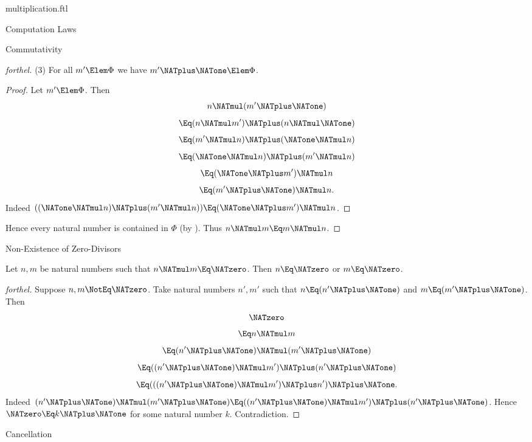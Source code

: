\documentclass{stex}
\begin{document}
\begin{smodule}{multiplication.ftl}
\begin{sfragment}{Computation Laws}
\begin{sfragment}{Commutativity}
\begin{proof}[forthel]
      (3) For all $m' \Elem \Phi$ we have $m' \NATplus \NATone \Elem \Phi$.
      \begin{proof}
        Let $m' \Elem \Phi$.
        Then
        \[  n \NATmul (m' \NATplus \NATone)                \]
        \[    \Eq (n \NATmul m') \NATplus (n \NATmul \NATone)  \]
        \[    \Eq (m' \NATmul n) \NATplus (\NATone \NATmul n)  \]
        \[    \Eq (\NATone \NATmul n) \NATplus (m' \NATmul n)  \]
        \[    \Eq (\NATone \NATplus m') \NATmul n            \]
        \[    \Eq (m' \NATplus \NATone) \NATmul n.           \]
        Indeed $((\NATone \NATmul n) \NATplus (m' \NATmul n)) \Eq (\NATone \NATplus m') \NATmul n$. %
      \end{proof}

      Hence every natural number is contained in $\Phi$ (by ).
      Thus $n \NATmul m \Eq m \NATmul n$.
    \end{proof}
  \end{sfragment}

  \begin{sfragment}{Non-Existence of Zero-Divisors}
    \begin{proposition}[forthel]
      Let $n, m$ be natural numbers such that $n \NATmul m \Eq \NATzero$.
      Then $n \Eq \NATzero$ or $m \Eq \NATzero$.
    \end{proposition}
    \begin{proof}[forthel]
      Suppose $n, m \NotEq \NATzero$.
      Take natural numbers $n', m'$ such that $n \Eq (n' \NATplus \NATone)$ and $m \Eq (m' \NATplus \NATone)$.
      Then
      \[  \NATzero                                     \]
      \[    \Eq n \NATmul m                         \]
      \[    \Eq (n' \NATplus \NATone) \NATmul (m' \NATplus \NATone)           \]
      \[    \Eq ((n' \NATplus \NATone) \NATmul m') \NATplus (n' \NATplus \NATone)    \]
      \[    \Eq (((n' \NATplus \NATone) \NATmul m') \NATplus n') \NATplus \NATone.   \]
      Indeed $(n' \NATplus \NATone) \NATmul (m' \NATplus \NATone) \Eq ((n' \NATplus \NATone) \NATmul m') \NATplus (n' \NATplus \NATone)$.
      Hence $\NATzero \Eq k \NATplus \NATone$ for some natural number $k$.
      Contradiction.
    \end{proof}
  \end{sfragment}

  \begin{sfragment}{Cancellation}



\end{sfragment}
\end{sfragment}
\end{smodule}
\end{document}
